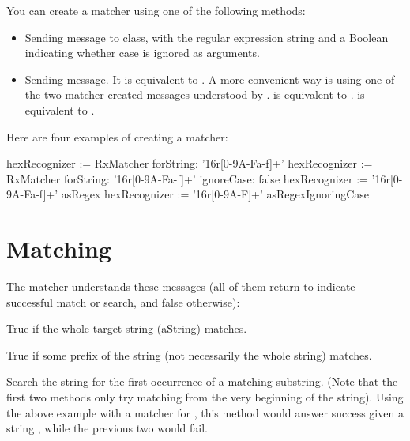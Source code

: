\documentclass[a4paper,10pt,twoside]{book}
\begin{document}
{You can create a matcher using one of the following methods: 	

\begin{itemize} 

\item Sending  message to  class, with the regular expression string and a Boolean indicating whether case is ignored as arguments. 	
\item Sending  message.  It is equivalent to . A more convenient way is using one of the two matcher-created messages understood by . 	  is equivalent to . 	  is equivalent to . 

\end{itemize}
Here are four examples of creating a matcher: 	

\begin{code}{}
hexRecognizer := RxMatcher forString: '16r[0-9A-Fa-f]+' 	
hexRecognizer := RxMatcher forString: '16r[0-9A-Fa-f]+' ignoreCase: false 
hexRecognizer := '16r[0-9A-Fa-f]+' asRegex 	
hexRecognizer := '16r[0-9A-F]+' asRegexIgnoringCase
\end{code}



\section{Matching}

The matcher understands these messages (all of them return  to indicate successful match or search, and false otherwise): 

\begin{description}
\item {} True if the whole target string (aString) matches. 

\item {} True if some prefix of the string (not necessarily the whole string) matches. 

\item {} Search the string for the first occurrence of a matching substring. (Note that the first two methods only try matching from 	the very beginning of the string). Using the above example with a  matcher for , this method would answer success given a string , while the previous two would fail. 


\end{description}}
\end{document}
